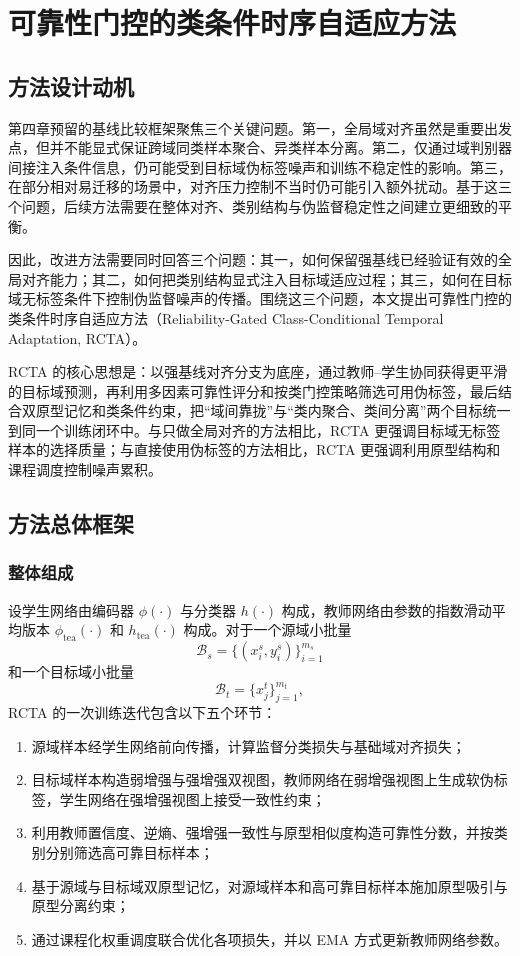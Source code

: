 \chapter{可靠性门控的类条件时序自适应方法}

\section{方法设计动机}
第四章预留的基线比较框架聚焦三个关键问题。第一，全局域对齐虽然是重要出发点，但并不能显式保证跨域同类样本聚合、异类样本分离。第二，仅通过域判别器间接注入条件信息，仍可能受到目标域伪标签噪声和训练不稳定性的影响。第三，在部分相对易迁移的场景中，对齐压力控制不当时仍可能引入额外扰动。基于这三个问题，后续方法需要在整体对齐、类别结构与伪监督稳定性之间建立更细致的平衡。

因此，改进方法需要同时回答三个问题：其一，如何保留强基线已经验证有效的全局对齐能力；其二，如何把类别结构显式注入目标域适应过程；其三，如何在目标域无标签条件下控制伪监督噪声的传播。围绕这三个问题，本文提出可靠性门控的类条件时序自适应方法（Reliability-Gated Class-Conditional Temporal Adaptation, RCTA）。

RCTA 的核心思想是：以强基线对齐分支为底座，通过教师--学生协同获得更平滑的目标域预测，再利用多因素可靠性评分和按类门控策略筛选可用伪标签，最后结合双原型记忆和类条件约束，把“域间靠拢”与“类内聚合、类间分离”两个目标统一到同一个训练闭环中。与只做全局对齐的方法相比，RCTA 更强调目标域无标签样本的选择质量；与直接使用伪标签的方法相比，RCTA 更强调利用原型结构和课程调度控制噪声累积。

\section{方法总体框架}
\subsection{整体组成}
设学生网络由编码器 $\phi(\cdot)$ 与分类器 $h(\cdot)$ 构成，教师网络由参数的指数滑动平均版本 $\phi_{\mathrm{tea}}(\cdot)$ 和 $h_{\mathrm{tea}}(\cdot)$ 构成。对于一个源域小批量
\begin{equation}
\mathcal{B}_s=\{(x_i^s,y_i^s)\}_{i=1}^{m_s}
\end{equation}
和一个目标域小批量
\begin{equation}
\mathcal{B}_t=\{x_j^t\}_{j=1}^{m_t},
\end{equation}
RCTA 的一次训练迭代包含以下五个环节：

\begin{enumerate}
\item 源域样本经学生网络前向传播，计算监督分类损失与基础域对齐损失；
\item 目标域样本构造弱增强与强增强双视图，教师网络在弱增强视图上生成软伪标签，学生网络在强增强视图上接受一致性约束；
\item 利用教师置信度、逆熵、强增强一致性与原型相似度构造可靠性分数，并按类别分别筛选高可靠目标样本；
\item 基于源域与目标域双原型记忆，对源域样本和高可靠目标样本施加原型吸引与原型分离约束；
\item 通过课程化权重调度联合优化各项损失，并以 EMA 方式更新教师网络参数。
\end{enumerate}

